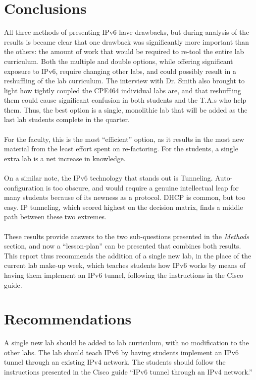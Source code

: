 \documentclass[12pt]{article}
\begin{document}
\section{Conclusions}
All three methods of presenting IPv6 have drawbacks, but during analysis of the results is became clear that one drawback was significantly more important than the others: the amount of work that would be required to re-tool the entire lab curriculum. Both the multiple and double options, while offering significant exposure to IPv6, require changing other labs, and could possibly result in a reshuffling of the lab curriculum. The interview with Dr. Smith also brought to light how tightly coupled the CPE464 individual labs are, and that reshuffling them could cause significant confusion in both students and the T.A.s who help them. Thus, the best option is a single, monolithic lab that will be added as the last lab students complete in the quarter.\\\\
For the faculty, this is the most ``efficient'' option, as it results in the most new material from the least effort spent on re-factoring. For the students, a single extra lab is a net increase in knowledge.\\\\
On a similar note, the IPv6 technology that stands out is Tunneling. Auto-configuration is too obscure, and would require a genuine intellectual leap for many students because of its newness as a protocol. DHCP is common, but too easy. IP tunneling, which scored highest on the decision matrix, finds a middle path between these two extremes.\\\\
These results provide answers to the two sub-questions presented in the \textit{Methods} section, and now a ``lesson-plan'' can be presented that combines both results. This report thus recommends the addition of a single new lab, in the place of the current lab make-up week, which teaches students how IPv6 works by means of having them implement an IPv6 tunnel, following the instructions in the Cisco guide.

\section{Recommendations}
A single new lab should be added to lab curriculum, with no modification to the other labs. The lab should teach IPv6 by having students implement an IPv6 tunnel through an existing IPv4 network. The students should follow the instructions presented in the Cisco guide ``IPv6 tunnel through an IPv4 network.''
\end{document}
